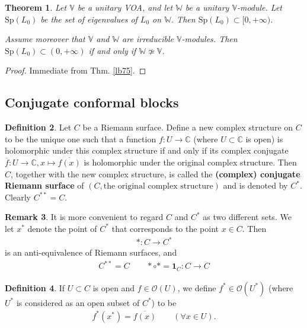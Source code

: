 \documentclass[11pt,b5paper,notitlepage]{article}
\theoremstyle{definition}
\newtheorem{df}{Definition}[section]
\newtheorem{rem}[df]{Remark}
\theoremstyle{plain}
\newtheorem{thm}[df]{Theorem}
\newcommand{\ovl}{\overline}
\newcommand{\id}{\mathbf{1}}
\newcommand{\scr}{\mathscr}
\newcommand{\Vbb}{\mathbb V}
\newcommand{\Wbb}{\mathbb W}
\newcommand{\Cbb}{\mathbb C}
\newcommand{\Sp}{\mathrm{Sp}}
\numberwithin{equation}{section}
\begin{document}
\begin{thm}\label{lb76}
Let $\Vbb$ be a unitary VOA, and let $\Wbb$ be a unitary $\Vbb$-module. Let $\Sp(L_0)$ be the set of eigenvalues of $L_0$ on $\Wbb$. Then $\Sp(L_0)\subset[0,+\infty)$. 

Assume moreover that $\Vbb$ and $\Wbb$ are irreducible $\Vbb$-modules. Then $\Sp(L_0)\subset(0,+\infty)$ if and only if $\Wbb\nsimeq \Vbb$.
\end{thm}

\begin{proof}
Immediate from Thm. \ref{lb75}.
\end{proof}



\subsection{Conjugate conformal blocks}


\begin{df}
Let $C$ be a Riemann surface. Define a new complex structure on $C$ to be the unique one such that a function $f:U\rightarrow\Cbb$ (where $U\subset\Cbb$ is open) is holomorphic under this complex structure if and only if its complex conjugate $\ovl f:U\rightarrow\Cbb,x\mapsto \ovl{f(x)}$ is holomorphic under the original complex structure. Then $C$, together with the new complex structure, is called the \textbf{(complex) conjugate Riemann surface} of $(C,\text{the original complex structure})$ and is denoted by $C^*$. Clearly $C^{**}=C$.
\end{df}

\begin{rem}
It is more convenient to regard $C$ and $C^*$ as two different sets. We let $x^*$ denote the point of $C^*$ that corresponds to the point $x\in C$. Then 
\begin{align*}
*:C\rightarrow C^*
\end{align*}
is an anti-equivalence of Riemann surfaces, and
\begin{align*}
C^{**}=C\qquad *\circ*=\id_C:C\rightarrow C
\end{align*}
\end{rem}


\begin{df}
If $U\subset C$ is open and $f\in\scr O(U)$, we define $f^*\in\scr O(U^*)$ \index{f@$f^*\in\scr O(U^*)$, the conjugate of $f\in\scr O(U)$} (where $U^*$ is considered as an open subset of $C^*$) to be
\begin{align*}
f^*(x^*)=\ovl{f(x)}\qquad(\forall x\in U).
\end{align*}
\end{df}
\end{document}
